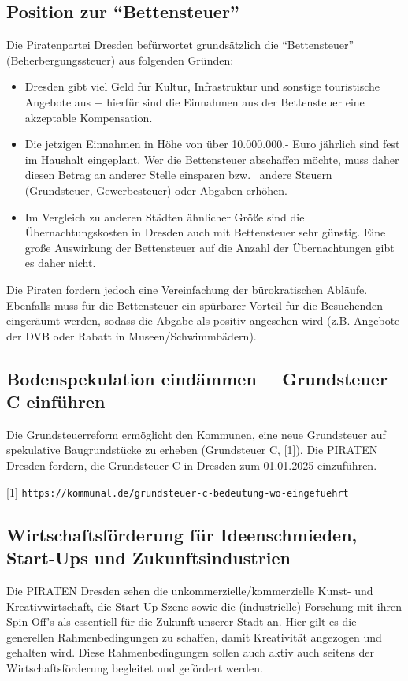 \documentclass[a4paper, 11pt]{article}
\begin{document}
\subsection{Position zur ``Bettensteuer''}
Die Piratenpartei Dresden befürwortet grundsätzlich die ``Bettensteuer'' (Beherbergungssteuer) aus folgenden Gründen:

\begin{itemize}

    \item Dresden gibt viel Geld für Kultur, Infrastruktur und sonstige touristische Angebote aus $-$ hierfür sind die Einnahmen aus der Bettensteuer eine akzeptable Kompensation.

    \item Die jetzigen Einnahmen in Höhe von über 10.000.000.- Euro jährlich sind fest im Haushalt eingeplant. Wer die Bettensteuer abschaffen möchte, muss daher diesen Betrag an anderer Stelle einsparen bzw.~ andere Steuern (Grundsteuer, Gewerbesteuer) oder Abgaben erhöhen.

    \item Im Vergleich zu anderen Städten ähnlicher Größe sind die Übernachtungskosten in Dresden auch mit Bettensteuer sehr günstig. Eine große Auswirkung der Bettensteuer auf die Anzahl der Übernachtungen gibt es daher nicht.
\end{itemize}

Die Piraten fordern jedoch eine Vereinfachung der bürokratischen Abläufe. Ebenfalls muss für die Bettensteuer ein spürbarer Vorteil für die Besuchenden eingeräumt werden, sodass die Abgabe als positiv angesehen wird (z.B. Angebote der DVB oder Rabatt in Museen/Schwimmbädern).


\subsection{Bodenspekulation eindämmen $-$ Grundsteuer C einführen}
Die Grundsteuerreform ermöglicht den Kommunen, eine neue Grundsteuer auf spekulative Baugrundstücke zu erheben (Grundsteuer C, [1]). Die PIRATEN Dresden fordern, die Grundsteuer C in Dresden zum 01.01.2025 einzuführen.\newline

\footnotesize{[1] \tt{https://kommunal.de/grundsteuer-c-bedeutung-wo-eingefuehrt}}


\subsection{Wirtschaftsförderung für Ideenschmieden, Start-Ups und Zukunftsindustrien}
Die PIRATEN Dresden sehen die unkommerzielle/kommerzielle Kunst- und Kreativwirtschaft, die Start-Up-Szene sowie die (industrielle) Forschung mit ihren Spin-Off's als essentiell für die Zukunft unserer Stadt an. Hier gilt es die generellen Rahmenbedingungen zu schaffen, damit Kreativität angezogen und gehalten wird. Diese Rahmenbedingungen sollen auch aktiv auch seitens der Wirtschaftsförderung begleitet und gefördert werden.
\end{document}
